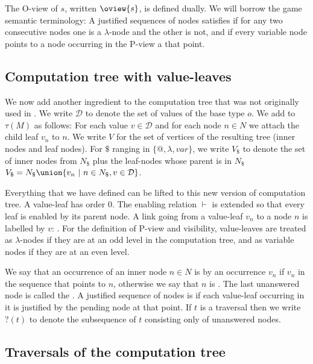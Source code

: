 The O-view of $s$, written $\oview{s}$, is defined dually. We will
borrow the game semantic terminology: A justified sequences of nodes
satisfies  if for any two consecutive nodes one
is a $\lambda$-node and the other is not, and 
if every variable node points to a node occurring in the P-view a
that point.

\subsection{Computation tree with value-leaves}


We now add another ingredient to the computation tree that was not
originally used in \cite{OngLics2006}.  We write $\mathcal{D}$ to
denote the set of values of the base type $o$.  We add
 to $\tau(M)$ as follows: For each value $v
\in \mathcal{D}$ and for each node $n \in N$ we attach the child
leaf $v_n$ to $n$.  We write $V$ for the set of vertices of the
resulting tree (\ie inner nodes and leaf nodes). For $\$$ ranging in
$\{@, \lambda, var \}$, we write $V_\$$ to denote the set of inner
nodes from $N_\$$ plus the leaf-nodes whose parent is in $N_\$$ \ie
$V_\$ = N_\$ \union \{ v_n \ | \ n \in N_\$, v \in \mathcal{D} \}$.


Everything that we have defined can be lifted to this new version of
computation tree. A value-leaf has order $0$. The enabling relation
$\vdash$ is extended so that every leaf is enabled by its parent
node. A link going from a value-leaf $v_n$ to a node $n$ is labelled
by $v$: . For the
definition of P-view and visibility, value-leaves are treated as
$\lambda$-nodes if they are at an odd level in the computation tree,
and as variable nodes if they are at an even level.

We say that an occurrence of an inner node $n \in N$ is
 by an occurrence $v_n$ if $v_n$ in
the sequence that points to $n$, otherwise we say that $n$ is
. The last unanswered node is called the
.  A justified sequence of nodes is
 if each value-leaf occurring in it is justified by the pending node at that point.  If $t$ is a traversal then we write
$?(t)$ to denote the subsequence of $t$ consisting only of
unanswered nodes.

\subsection{Traversals of the computation tree}
\label{subsec:traversal}

